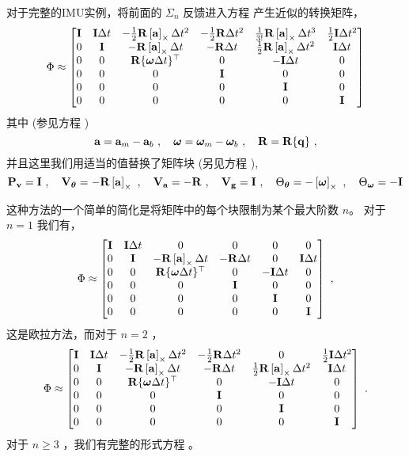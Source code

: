对于完整的IMU实例，将前面的 $\Sigma_n$ 反馈进入方程  产生近似的转换矩阵，
%
\begin{equation}
\Phi \approx \begin{bmatrix}
{\bf I} & {\bf I}\Delta t & -\frac{1}{2}{\bf R}\left[{\bf a}\right]_\times\Delta t^2 &  -\tfrac12{\bf R}\Delta t^2 & \frac{1}{3!}{\bf R}\left[{\bf a}\right]_\times\Delta t^3 & \tfrac12{\bf I}\Delta t^2 \\
0 & {\bf I} & -{\bf R}\left[{\bf a}\right]_\times\Delta t &  -{\bf R}\Delta t & \frac{1}{2}{\bf R}\left[{\bf a}\right]_\times\Delta t^2 & {\bf I}\Delta t \\
0 & 0 & {\bf R}\{{\bm \omega}\Delta t\}^{\top} &  0 & -{\bf I}\Delta t & 0 \\
0 & 0 & 0 & {\bf I} & 0 & 0 \\
0 & 0 & 0 & 0 & {\bf I} & 0 \\
0 & 0 & 0 & 0 & 0 & {\bf I} \\
\end{bmatrix}\label{equ:FullIMU_PhiTrunc}
\end{equation}
%
其中 (参见方程 )
%
\begin{equation*}
{\bf a}={\bf a}_m-{\bf a}_b~,\quad{\bm \omega}={\bm \omega}_m-{\bm \omega}_b~,\quad{\bf R}={\bf R}\{{\bf q}\}~,
\end{equation*}
%
并且这里我们用适当的值替换了矩阵块 (另见方程 ),
%
\begin{equation*}
{\bf P}_{\bf v}={\bf I}~, \quad 
{\bf V}_{\bm \theta}=-{\bf R}\left[{\bf a}\right]_\times~, \quad 
{\bf V}_{\bf a}=-{\bf R}~, \quad
{\bf V}_{\bf g}={\bf I}~, \quad
\Theta_{\bm \theta}=-\left[{\bm \omega}\right]_\times~, \quad
\Theta_{\bm \omega}=-{\bf I} 
\end{equation*}

这种方法的一个简单的简化是将矩阵中的每个块限制为某个最大阶数 $n$。
对于 $n=1$ 我们有，
%
\begin{equation}
\Phi \approx \begin{bmatrix}
{\bf I} & {\bf I}\Delta t & 0 & 0 & 0 & 0 \\
0 & {\bf I} & -{\bf R}\left[{\bf a}\right]_\times\Delta t &  -{\bf R}\Delta t & 0 & {\bf I}\Delta t \\
0 & 0 & {\bf R}\{{\bm \omega}\Delta t\}^{\top} &  0 & -{\bf I}\Delta t & 0 \\
0 & 0 & 0 & {\bf I} & 0 & 0 \\
0 & 0 & 0 & 0 & {\bf I} & 0 \\
0 & 0 & 0 & 0 & 0 & {\bf I} \\
\end{bmatrix}~,\label{equ:FullIMU_PhiTrunc1}
\end{equation}
%
这是欧拉方法，而对于 $n=2$ ，
%
\begin{equation}
\Phi \approx \begin{bmatrix}
{\bf I} & {\bf I}\Delta t & -\frac{1}{2}{\bf R}\left[{\bf a}\right]_\times\Delta t^2 &  -\tfrac12{\bf R}\Delta t^2 & 0 & \tfrac12{\bf I}\Delta t^2 \\
0 & {\bf I} & -{\bf R}\left[{\bf a}\right]_\times\Delta t &  -{\bf R}\Delta t & \frac{1}{2}{\bf R}\left[{\bf a}\right]_\times\Delta t^2 & {\bf I}\Delta t \\
0 & 0 & {\bf R}\{{\bm \omega}\Delta t\}^{\top} &  0 & -{\bf I}\Delta t & 0 \\
0 & 0 & 0 & {\bf I} & 0 & 0 \\
0 & 0 & 0 & 0 & {\bf I} & 0 \\
0 & 0 & 0 & 0 & 0 & {\bf I} \\
\end{bmatrix}~.\label{equ:FullIMU_PhiTrunc2}
\end{equation}
%
对于 $n\ge3$ ，我们有完整的形式方程  。
